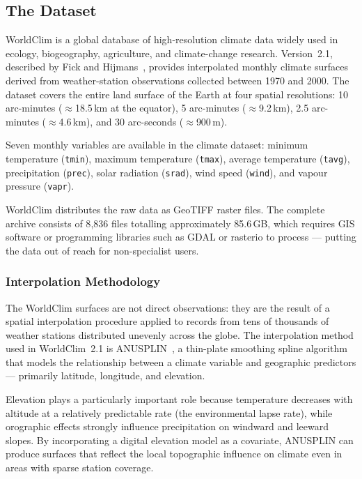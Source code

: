\subsection{The Dataset}\label{REL_WORLDCLIM_DATA}

WorldClim is a global database of high-resolution climate data widely used in
ecology, biogeography, agriculture, and climate-change research. Version~2.1,
described by Fick and Hijmans~\cite{fick2017worldclim}, provides interpolated
monthly climate surfaces derived from weather-station observations collected
between 1970 and 2000. The dataset covers the entire land surface of the Earth
at four spatial resolutions: 10 arc-minutes ($\approx$18.5\,km at the equator),
5 arc-minutes ($\approx$9.2\,km), 2.5 arc-minutes ($\approx$4.6\,km), and 30
arc-seconds ($\approx$900\,m).

Seven monthly variables are available in the climate dataset: minimum
temperature (\texttt{tmin}), maximum temperature (\texttt{tmax}), average
temperature (\texttt{tavg}), precipitation (\texttt{prec}), solar radiation
(\texttt{srad}), wind speed (\texttt{wind}), and vapour pressure
(\texttt{vapr}).

WorldClim distributes the raw data as GeoTIFF raster files. The complete archive
consists of 8{,}836 files totalling approximately 85.6\,GB, which requires GIS
software or programming libraries such as GDAL or rasterio to process ---
putting the data out of reach for non-specialist users.

\subsubsection{Interpolation Methodology}\label{REL_WORLDCLIM_INTERP}

The WorldClim surfaces are not direct observations: they are the result of a
spatial interpolation procedure applied to records from tens of thousands of
weather stations distributed unevenly across the globe. The interpolation method
used in WorldClim~2.1 is ANUSPLIN~\cite{hutchinson1995}, a thin-plate smoothing
spline algorithm that models the relationship between a climate variable and
geographic predictors --- primarily latitude, longitude, and elevation.

Elevation plays a particularly important role because temperature decreases with
altitude at a relatively predictable rate (the environmental lapse rate), while
orographic effects strongly influence precipitation on windward and leeward
slopes. By incorporating a digital elevation model as a covariate, ANUSPLIN can
produce surfaces that reflect the local topographic influence on climate even in
areas with sparse station coverage.

